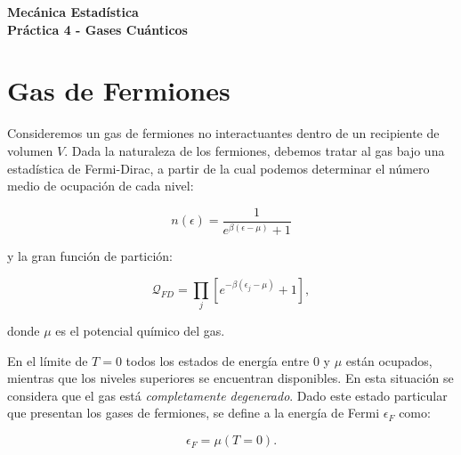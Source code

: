 \documentclass[a4paper,11pt]{article}
\begin{document}
\pagestyle{fancy}
\chead{\small \the\year}



\thispagestyle{plain}
\begin{center}
    \textbf{\large
        Mecánica Estadística \\
        Práctica 4 - Gases Cuánticos
    }
\end{center}
\vspace{-1.5em}




\section{Gas de Fermiones}
\label{sec:gas-de-fermi}

Consideremos un gas de fermiones no interactuantes dentro de un 
recipiente de volumen $V$.
Dada la naturaleza de los fermiones, debemos tratar al gas bajo una 
estadística de Fermi-Dirac, a partir de la cual podemos determinar el 
número medio de ocupación de cada nivel:

$$ n(\epsilon) = \frac{1}{e^{\beta(\epsilon - \mu)} + 1} $$

\noindent y la gran función de partición:

$$
\mathcal{Q}_{FD} =
  \prod_j \left[ e^{-\beta(\epsilon_j - \mu)} + 1\right],
$$

\noindent donde $\mu$ es el potencial químico del gas.

En el límite de $T = 0$ todos los estados de energía entre 0 y $\mu$ 
están ocupados, mientras que los niveles superiores se encuentran 
disponibles.
En esta situación se considera que el gas está \emph{completamente 
degenerado}.
Dado este estado particular que presentan los gases de fermiones, se 
define a la energía de Fermi $\epsilon_F$ como:

$$ \epsilon_F = \mu(T=0). $$
\end{document}
